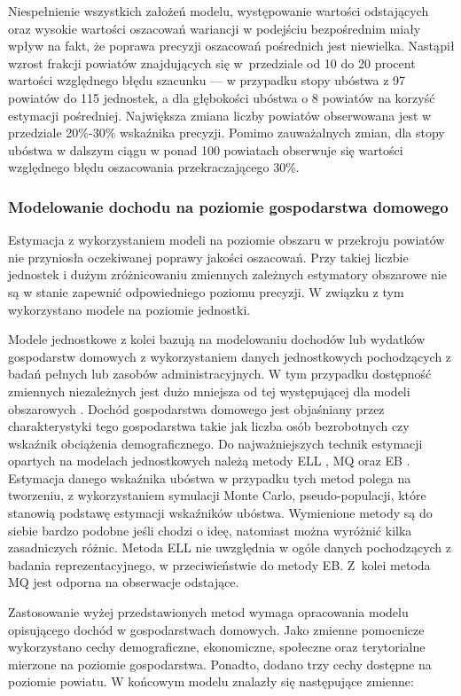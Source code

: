 Niespełnienie wszystkich założeń modelu, występowanie wartości odstających oraz wysokie wartości oszacowań wariancji w podejściu bezpośrednim miały wpływ na fakt, że poprawa precyzji oszacowań pośrednich jest niewielka. Nastąpił wzrost frakcji powiatów znajdujących się w~przedziale od 10 do 20 procent wartości względnego błędu szacunku --- w przypadku stopy ubóstwa z 97 powiatów do 115 jednostek, a dla głębokości ubóstwa o 8 powiatów na korzyść estymacji pośredniej. Największa zmiana liczby powiatów obserwowana jest w przedziale 20\%-30\% wskaźnika precyzji. Pomimo zauważalnych zmian, dla stopy ubóstwa w dalszym ciągu w ponad 100 powiatach obserwuje się wartości względnego błędu oszacowania przekraczającego 30\%. 

\subsubsection{Modelowanie dochodu na poziomie gospodarstwa domowego}

Estymacja z wykorzystaniem modeli na poziomie obszaru w przekroju powiatów nie przyniosła oczekiwanej poprawy jakości oszacowań. Przy takiej liczbie jednostek i dużym zróżnicowaniu zmiennych zależnych estymatory obszarowe nie są w stanie zapewnić odpowiedniego poziomu precyzji. W związku z tym wykorzystano modele na poziomie jednostki.

Modele jednostkowe z kolei bazują na modelowaniu dochodów lub wydatków gospodarstw domowych z wykorzystaniem danych jednostkowych pochodzących z badań pełnych lub zasobów administracyjnych. W tym przypadku dostępność zmiennych niezależnych jest dużo mniejsza od tej występującej dla modeli obszarowych \citep{molina2016}. Dochód gospodarstwa domowego jest objaśniany przez charakterystyki tego gospodarstwa takie jak liczba osób bezrobotnych czy wskaźnik obciążenia demograficznego. Do najważniejszych technik estymacji opartych na modelach jednostkowych należą metody ELL \citep{ell2003}, MQ \citep{mq2006} oraz EB \citep{ebp2010}. Estymacja danego wskaźnika ubóstwa w przypadku tych metod polega na tworzeniu, z wykorzystaniem symulacji Monte Carlo, pseudo-populacji, które stanowią podstawę estymacji wskaźników ubóstwa. Wymienione metody są do siebie bardzo podobne jeśli chodzi o ideę, natomiast można wyróżnić kilka zasadniczych różnic. Metoda ELL nie uwzględnia w ogóle danych pochodzących z badania reprezentacyjnego, w przeciwieństwie do metody EB. Z~kolei metoda MQ jest odporna na obserwacje odstające.

Zastosowanie wyżej przedstawionych metod wymaga opracowania modelu opisującego dochód w gospodarstwach domowych. Jako zmienne pomocnicze wykorzystano cechy demograficzne, ekonomiczne, społeczne oraz terytorialne mierzone na poziomie gospodarstwa. Ponadto, dodano trzy cechy dostępne na poziomie powiatu. W końcowym modelu znalazły się następujące zmienne:

